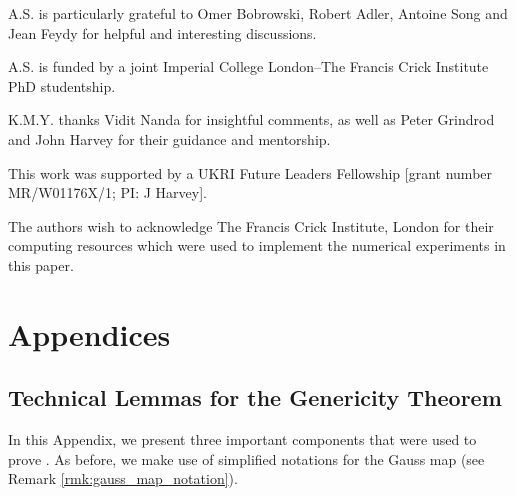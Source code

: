 \documentclass[11pt]{article}
\theoremstyle{plain}
\theoremstyle{definition}
\theoremstyle{remark}
\begin{document}
A.S. is particularly grateful to Omer Bobrowski, Robert Adler, Antoine Song and Jean Feydy for helpful and interesting discussions.

A.S. is funded by a joint Imperial College London--The Francis Crick Institute PhD studentship. 

K.M.Y. thanks Vidit Nanda for insightful comments, as well as Peter Grindrod and John Harvey for their guidance and mentorship. 

This work was supported by a UKRI Future Leaders Fellowship [grant number MR/W01176X/1; PI: J Harvey].

The authors wish to acknowledge The Francis Crick Institute, London
for their computing resources which were used to implement the numerical experiments in this paper.



{\footnotesize 


}


\appendix
\section*{Appendices}
\renewcommand{\thesubsection}{\Alph{subsection}}
\label{sec:Appendix}

\subsection{Technical Lemmas for the Genericity Theorem}


In this Appendix, we present three important components that were used to prove .
As before, we make use of simplified notations for the Gauss map (see Remark \ref{rmk:gauss_map_notation}). 
\end{document}

